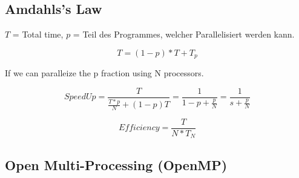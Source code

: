 \subsection{Amdahls's Law}
$T$ = Total time, $p$ = Teil des Programmes, welcher Parallelisiert werden kann.

\[ T = (1-p) * T + T_p \]

If we can paralleize the p fraction using N processors.

\[ SpeedUp= \frac{T}{\frac{T*p}{N}+(1-p)T} = \frac{1}{1-p+ \frac{p}{N}} = \frac{1}{s+\frac{p}{N}} \]

\[ Efficiency = \frac{T}{N * T_N} \]

\subsection{Open Multi-Processing (OpenMP)}




